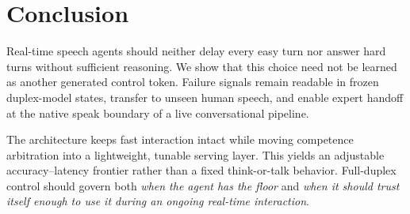 \section{Conclusion}
\label{sec:conclusion}
Real-time speech agents should neither delay every easy turn nor answer hard
turns without sufficient reasoning. We show that this choice need not be
learned as another generated control token. Failure signals remain readable in
frozen duplex-model states, transfer to unseen human speech, and enable expert
handoff at the native speak boundary of a live conversational pipeline.

The architecture keeps fast interaction intact while moving competence
arbitration into a lightweight, tunable serving layer. This yields an adjustable
accuracy--latency frontier rather than a fixed think-or-talk behavior. Full-duplex
control should govern both \emph{when the agent has the floor} and \emph{when it
should trust itself enough to use it during an ongoing real-time interaction}.
\label{sec:main-end}
